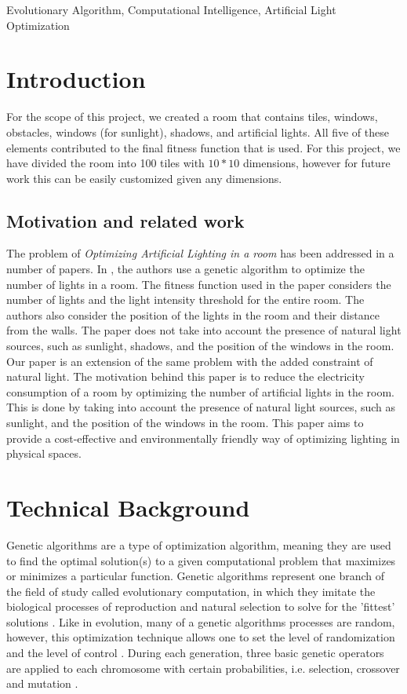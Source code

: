 \documentclass[conference]{IEEEtran}
\begin{document}
\begin{IEEEkeywords}
    Evolutionary Algorithm, Computational Intelligence, Artificial Light Optimization
\end{IEEEkeywords}

\section{Introduction}

For the scope of this project, we created a room that contains tiles,
windows, obstacles, windows (for sunlight), shadows, and artificial lights. All five of these elements contributed to the final
fitness function that is used. For this project, we have divided the room into
100 tiles with \(10*10\) dimensions, however for future work this can be easily customized given any dimensions.

\subsection{Motivation and related work}
The problem of \textit{Optimizing Artificial Lighting in a room} has been addressed in a
number of papers. In \cite{icict_2019}, the authors use a genetic algorithm to
optimize the number of lights in a room. The fitness function used in the paper
considers the number of lights and the light intensity threshold for the entire
room. The authors also consider the position of the lights in the room and
their distance from the walls. The paper does not take into account the
presence of natural light sources, such as sunlight, shadows, and the position of the
windows in the room. Our paper is an extension of the same problem with the
added constraint of natural light. The motivation behind this paper is to
reduce the electricity consumption of a room by optimizing the number of
artificial lights in the room. This is done by taking into account the presence
of natural light sources, such as sunlight, and the position of the windows in
the room. This paper aims to provide a cost-effective and environmentally
friendly way of optimizing lighting in physical spaces.

\section{Technical Background}
Genetic algorithms are a type of optimization algorithm,
meaning they are used to find the optimal solution(s) to a
given computational problem that maximizes or minimizes a
particular function. Genetic algorithms represent one branch of
the field of study called evolutionary computation, in which
they imitate the biological processes of reproduction and
natural selection to solve for the ’fittest’ solutions \cite{ref9}. Like in
evolution, many of a genetic algorithms processes are random,
however, this optimization technique allows one to set the level
of randomization and the level of control \cite{ref9}. During each
generation, three basic genetic operators are applied to each
chromosome with certain probabilities, i.e. selection, crossover
and mutation \cite{ref9}.
\end{document}
